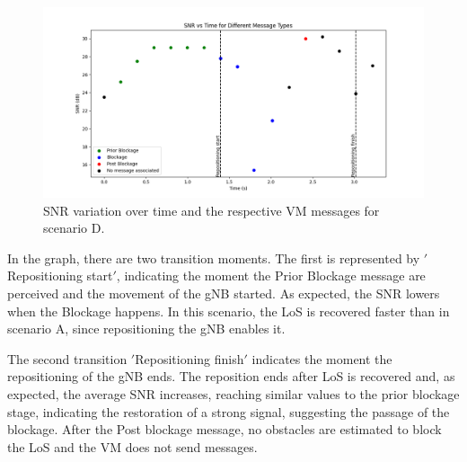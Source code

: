 \begin{figure}[H]
    \centering
    \includegraphics[width=\linewidth]{figures/results_3}
    \caption{SNR variation over time and the respective VM messages for scenario D.}
    \label{fig:results_3}
\end{figure}

In the graph, there are two transition moments.
The first is represented by \('\)Repositioning start\('\), indicating the moment the Prior Blockage message are perceived and the movement of the gNB started.
As expected, the SNR lowers when the Blockage happens.
In this scenario, the LoS is recovered faster than in scenario A, since repositioning the gNB enables it.

The second transition \('\)Repositioning finish\('\) indicates the moment the repositioning of the gNB ends.
The reposition ends after LoS is recovered and, as expected, the average SNR increases, reaching similar values to the prior blockage stage, indicating the restoration of a strong signal, suggesting the passage of the blockage.
After the Post blockage message, no obstacles are estimated to block the LoS and the VM does not send messages.




